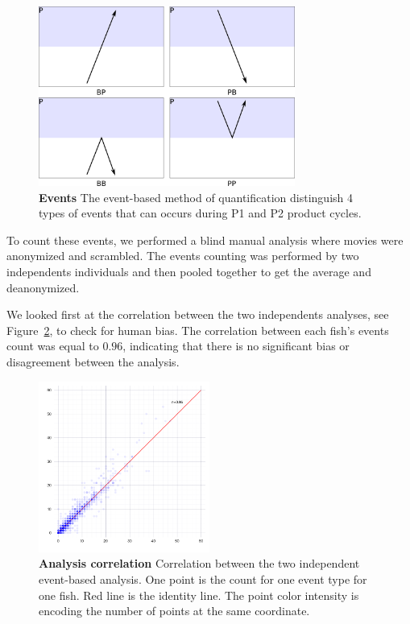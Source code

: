     \begin{figure}[h]
      \centering
      \includegraphics[width=0.75\textwidth]{part_2/assets/events.png}
      \caption{\textbf{Events} The event-based method of quantification distinguish 4 types of events that can occurs during P1 and P2 product cycles.}
      \label{events}
    \end{figure}

  To count these events, we performed a blind manual analysis where movies were anonymized and scrambled. The events counting was performed by two independents individuals and then pooled together to get the average and deanonymized.

  We looked first at the correlation between the two independents analyses, see Figure~\ref{correlation_count}, to check for human bias. The correlation between each fish's events count was equal to $0.96$, indicating that there is no significant bias or disagreement between the analysis.

    \begin{figure}[h]
      \centering
      \includegraphics[width=0.50\textwidth]{part_2/assets/correlation.png}
      \caption{\textbf{Analysis correlation} Correlation between the two independent event-based analysis. One point is the count for one event type for one fish. Red line is the identity line. The point color intensity is encoding the number of points at the same coordinate.}
      \label{correlation_count}
    \end{figure}

